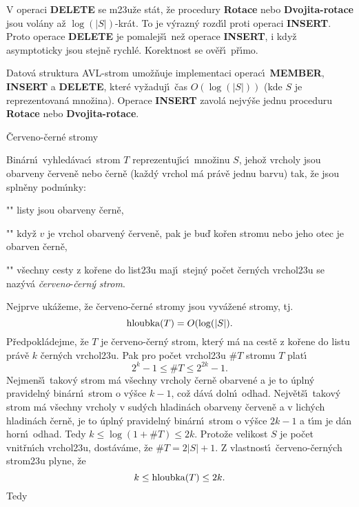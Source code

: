 \flushpar V operaci {\bf DELETE} se m\accent23u\v ze st\'at, \v ze procedury 
{\bf Rotace} nebo {\bf Dvojita-rotace} jsou vol\'any a\v z $\log(
|S|)$-kr\'at. 
To je v\'yrazn\'y rozd\'\i l proti operaci {\bf INSERT}. Proto operace 
{\bf DELETE} je pomalej\v s\'\i\ ne\v z operace {\bf INSERT}, i kdy\v z 
asymptoticky jsou stejn\v e rychl\'e. Korektnost se 
ov\v e\v r\'\i\ p\v r\'\i mo.

Datov\'a struktura AVL-strom 
umo\v z\v nuje implementaci operac\'\i\ {\bf MEMBER}, {\bf INSERT} a 
{\bf DELETE}, kter\'e vy\v zaduj\'\i\ \v cas $O(\log(|S|))$ (kde $
S$ je 
reprezentovan\'a mno\v zina).  Ope\-race {\bf INSERT} zavol\'a 
nejv\'y\v se jednu proceduru {\bf Rotace} nebo {\bf Dvo\-ji\-ta-rotace}.  
\endproclaim
\medskip

\heading 
\v Cerveno-\v cern\'e stromy
\endheading

\flushpar Bin\'arn\'\i\ vyhled\'avac\'\i\ strom $T$ reprezentuj\'\i c\'\i\ 
mno\v zinu $S$, jeho\v z vrcholy jsou obarveny \v cerven\v e nebo 
\v cern\v e (ka\v zd\'y vrchol m\'a pr\'av\v e jednu barvu) tak, \v ze jsou 
spln\v eny podm\'\i nky:
\roster
\item"{}"
listy jsou obarveny \v cern\v e,
\item"{}"
kdy\v z $v$ je vrchol obarven\'y \v cerven\v e, pak je bu\v d ko\v ren 
stromu nebo jeho otec je obarven \v cern\v e,
\item"{}"
v\v sechny cesty z ko\v rene do list\accent23u maj\'\i\ stejn\'y 
po\v cet \v cer\-n\'ych vrchol\accent23u
\endroster
se naz\'yv\'a \emph{\v cerveno}-\emph{\v cern\'y} \emph{strom}. 
\medskip

\flushpar Nejprve uk\'a\v zeme, \v ze \v cerveno-\v cern\'e stromy jsou 
vyv\'a\v zen\'e stro\-my, tj. $$\operatorname{hloubka}(T)=O(\log(|S|).$$
P\v redpokl\'adejme, \v ze $T$ je \v cerveno-\v cern\'y strom, kter\'y m\'a 
na cest\v e z ko\v rene do listu pr\'av\v e $k$ \v cern\'ych 
vrchol\accent23u. Pak pro po\v cet vrchol\accent23u $\#T$ 
stromu $T$ plat\'\i\ 
$$2^k-1\le \#T\le 2^{2k}-1.$$
Nejmen\v s\'\i\ takov\'y strom m\'a v\v sechny vrcholy \v cern\v e 
obarven\'e a je to \'upln\'y pravideln\'y bin\'arn\'\i\ strom o 
v\'y\v sce $k-1$, co\v z d\'av\'a doln\'\i\ odhad.  Nejv\v et\v s\'\i\ takov\'y 
strom m\'a v\v sechny vrcholy v sud\'ych hladin\'ach obarveny 
\v cerven\v e a v lich\'ych hladin\'ach \v cern\v e, je to \'upln\'y 
pravideln\'y bin\'arn\'\i\ strom o v\'y\v sce $2k-1$ a t\'\i m je d\'an 
horn\'\i\ odhad. Tedy $k\le\log(1+\#T)\le 2k$.
Proto\v ze velikost $S$ je po\v cet vnit\v rn\'\i ch vrchol\accent23u, 
dost\'av\'ame, \v ze $\#T=2|S|+1$. Z vlastnost\'\i\ \v cerveno-\v cern\'ych 
strom\accent23u plyne, \v ze 
$$k\le\operatorname{hloubka}(T)\le 2k.$$
Tedy
\medskip

